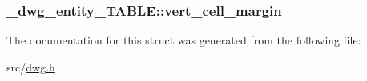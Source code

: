 \hypertarget{struct__dwg__entity__TABLE_a9beff72c1b79d65fb7e70ceec7729577}{
\subsubsection[{vert\-\_\-cell\-\_\-margin}]{ {\bf \-\_\-dwg\-\_\-entity\-\_\-\-T\-A\-B\-L\-E\-::vert\-\_\-cell\-\_\-margin}}}\label{struct__dwg__entity__TABLE_a9beff72c1b79d65fb7e70ceec7729577}


\-The documentation for this struct was generated from the following file\-:\begin{DoxyCompactItemize}
\item 
src/\hyperlink{dwg_8h}{dwg.\-h}\end{DoxyCompactItemize}
